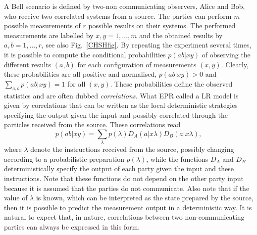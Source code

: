 \documentclass[a4paper]{article}
\begin{document}
A Bell scenario is defined by two-non communicating observers, Alice and Bob, who receive two correlated systems from a source. The parties can perform $m$ possible measurements of $r$ possible results on their systems. The performed measurements are labelled by $x,y=1,\ldots,m$ and the obtained results by $a,b=1,\ldots,r$, see also Fig.~\ref{CHSHfig}. By repeating the experiment several times, it is possible to compute the conditional probabilities $p(ab|xy)$ of observing the different results $(a,b)$ for each configuration of measurements $(x,y)$. Clearly, these probabilities are all positive and normalised, $p(ab|xy)>0$ and $\sum_{a,b}p(ab|xy)=1$ for all $(x,y)$. These probabilities define the observed statistics and are often dubbed \emph{correlations}. What EPR called a LR model is given by correlations that can be written as the local deterministic strategies specifying the output given the input and possibly correlated through the particles received from the source. These correlations read
\begin{equation}
\label{lrmodel}
p(ab|xy)=\sum_{\lambda}p(\lambda)D_A(a|x\lambda)D_B(a|x\lambda) ,
\end{equation}
where $\lambda$ denote the instructions received from the source, possibly changing according to a probabilistic preparation $p(\lambda)$, while the functions $D_A$ and $D_B$ deterministically specify the output of each party given the input and these instructions. Note that these functions do not depend on the other party input because it is assumed that the parties do not communicate. Also note that if the value of $\lambda$ is known, which can be interpreted as the state prepared by the source, then it is possible to predict the measurement output in a deterministic way. It is natural to expect that, in nature, correlations between two non-communicating parties can always be expressed in this form.
\end{document}
